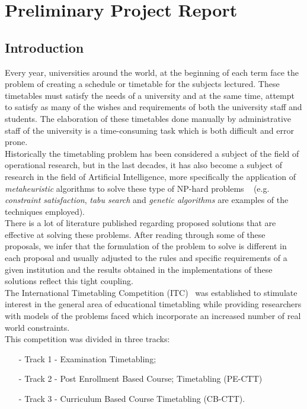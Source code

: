 \chapter{Preliminary Project Report}
\label{introduction}
\thispagestyle{plain}
\section{Introduction}
Every year, universities around the world, at the beginning of each term face the problem of creating a schedule or timetable for the subjects lectured. These timetables must satisfy the needs of a university and at the same time, attempt to satisfy as many of the wishes and requirements of both the university staff and students. The elaboration of these timetables done manually by administrative staff of the university is a time-consuming task which is both difficult and error prone. \\
Historically the timetabling problem has been considered a subject of the field of operational research, but in the last decades, it has also become a subject of research in the field of Artificial Intelligence, more specifically the application of \emph{metaheuristic} algorithms to solve these type of NP-hard problems ~\cite{Cooper1996, Even1976} (e.g. \emph{constraint satisfaction}, \emph{tabu search} and \emph{genetic algorithms} are examples of the techniques employed). \\
There is a lot of literature published regarding proposed solutions that are effective at solving these problems. After reading through some of these proposals, we infer that the formulation of the problem to solve is different in each proposal and usually adjusted to the rules and specific requirements of a given institution and the results obtained in the implementations of these solutions reflect this tight coupling. \\
The International Timetabling Competition (ITC)~\cite{McCollum} was established to stimulate interest in the general area of educational timetabling while providing researchers with models of the problems faced which incorporate an increased number of real world constraints.\\
This competition was divided in three tracks:
\begin{itemize}
\item[-] Track 1 - Examination Timetabling;
\item[-] Track 2 - Post Enrollment Based Course; Timetabling (PE-CTT)
\item[-] Track 3 - Curriculum Based Course Timetabling (CB-CTT).
\end{itemize}
